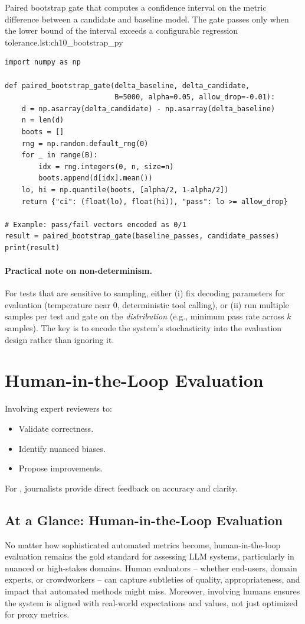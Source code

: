 \begin{codebox}{Paired bootstrap gate that computes a confidence interval on the metric difference between a candidate and baseline model. The gate passes only when the lower bound of the interval exceeds a configurable regression tolerance.}{lst:ch10_bootstrap_py}
\begin{verbatim}
import numpy as np

def paired_bootstrap_gate(delta_baseline, delta_candidate,
                          B=5000, alpha=0.05, allow_drop=-0.01):
    d = np.asarray(delta_candidate) - np.asarray(delta_baseline)
    n = len(d)
    boots = []
    rng = np.random.default_rng(0)
    for _ in range(B):
        idx = rng.integers(0, n, size=n)
        boots.append(d[idx].mean())
    lo, hi = np.quantile(boots, [alpha/2, 1-alpha/2])
    return {"ci": (float(lo), float(hi)), "pass": lo >= allow_drop}

# Example: pass/fail vectors encoded as 0/1
result = paired_bootstrap_gate(baseline_passes, candidate_passes)
print(result)
\end{verbatim}
\end{codebox}

\paragraph{Practical note on non-determinism.}
For tests that are sensitive to sampling, either (i) fix decoding parameters for evaluation (temperature near 0, deterministic tool calling), or (ii) run multiple samples per test and gate on the \emph{distribution} (e.g., minimum pass rate across $k$ samples).
The key is to encode the system's stochasticity into the evaluation design rather than ignoring it.

\section{Human-in-the-Loop Evaluation}
\label{sec:ch10-human-in-the-loop-evaluation}
Involving expert reviewers to:
\begin{itemize}
    \item Validate correctness.
    \item Identify nuanced biases.
    \item Propose improvements.
\end{itemize}
For \ishtar{}, journalists provide direct feedback on accuracy and clarity.

\subsection*{At a Glance: Human-in-the-Loop Evaluation}
No matter how sophisticated automated metrics become, human-in-the-loop evaluation remains the gold standard for assessing LLM systems, particularly in nuanced or high-stakes domains. Human evaluators – whether end-users, domain experts, or crowdworkers – can capture subtleties of quality, appropriateness, and impact that automated methods might miss. Moreover, involving humans ensures the system is aligned with real-world expectations and values, not just optimized for proxy metrics.  

